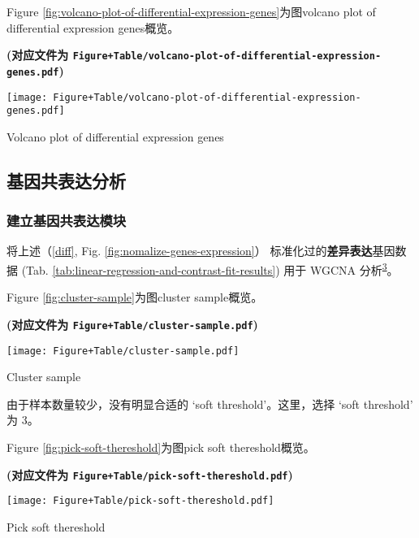 \documentclass[
]{article}
\begin{document}
Figure \ref{fig:volcano-plot-of-differential-expression-genes}为图volcano plot of differential expression genes概览。

\textbf{(对应文件为 \texttt{Figure+Table/volcano-plot-of-differential-expression-genes.pdf})}

\def\@captype{figure}
\begin{center}
\texttt{[image: Figure+Table/volcano-plot-of-differential-expression-genes.pdf]}
\caption{Volcano plot of differential expression genes}\label{fig:volcano-plot-of-differential-expression-genes}
\end{center}

\hypertarget{ux57faux56e0ux5171ux8868ux8fbeux5206ux6790}{%
\subsection{基因共表达分析}\label{ux57faux56e0ux5171ux8868ux8fbeux5206ux6790}}

\hypertarget{ux5efaux7acbux57faux56e0ux5171ux8868ux8fbeux6a21ux5757}{%
\subsubsection{建立基因共表达模块}\label{ux5efaux7acbux57faux56e0ux5171ux8868ux8fbeux6a21ux5757}}

将上述（\ref{diff}, Fig. \ref{fig:nomalize-genes-expression}）
标准化过的\textbf{差异表达}基因数据
(Tab. \ref{tab:linear-regression-and-contrast-fit-results})
用于 WGCNA 分析\textsuperscript{\protect\hyperlink{ref-WgcnaAnRPacLangfe2008}{3}}。

Figure \ref{fig:cluster-sample}为图cluster sample概览。

\textbf{(对应文件为 \texttt{Figure+Table/cluster-sample.pdf})}

\def\@captype{figure}
\begin{center}
\texttt{[image: Figure+Table/cluster-sample.pdf]}
\caption{Cluster sample}\label{fig:cluster-sample}
\end{center}

由于样本数量较少，没有明显合适的 `soft threshold'。这里，选择 `soft threshold' 为 3。

Figure \ref{fig:pick-soft-thereshold}为图pick soft thereshold概览。

\textbf{(对应文件为 \texttt{Figure+Table/pick-soft-thereshold.pdf})}

\def\@captype{figure}
\begin{center}
\texttt{[image: Figure+Table/pick-soft-thereshold.pdf]}
\caption{Pick soft thereshold}\label{fig:pick-soft-thereshold}
\end{center}
\end{document}
